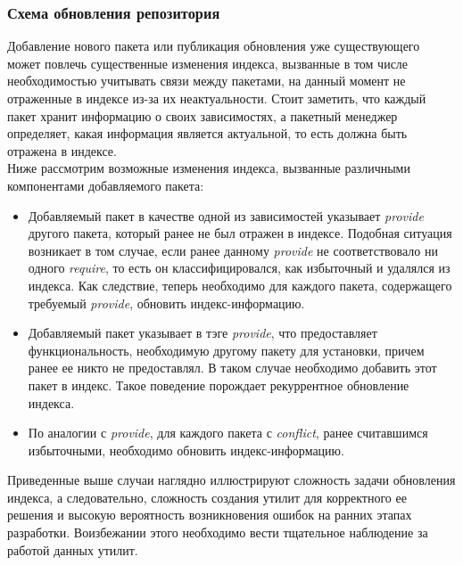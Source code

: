 \subsubsection{Схема обновления репозитория}
Добавление нового пакета или публикация обновления уже существующего
может повлечь существенные изменения индекса, вызванные в том числе
необходимостью учитывать связи между пакетами, на данный момент не
отраженные в индексе из-за их неактуальности. Стоит заметить, что 
каждый пакет хранит информацию о своих зависимостях, а пакетный
менеджер определяет, какая информация является актуальной, то есть
должна быть отражена в индексе.\\
Ниже рассмотрим возможные изменения индекса, вызванные различными
компонентами добавляемого пакета:
\begin{itemize}
\item
Добавляемый пакет в качестве одной из зависимостей указывает \textit{provide}
другого пакета, который ранее не был отражен в индексе. Подобная ситуация
возникает в том случае, если ранее данному \textit{provide} не соответствовало ни 
одного \textit{require}, то есть он классифицировался, как избыточный и удалялся
из индекса. Как следствие, теперь необходимо для каждого пакета, содержащего
требуемый \textit{provide}, обновить индекс-информацию.
\item
Добавляемый пакет указывает в тэге \textit{provide}, что предоставляет функциональность,
необходимую другому пакету для установки, причем ранее ее никто не предоставлял. В таком
случае необходимо добавить этот пакет в индекс. 
Такое поведение порождает рекуррентное обновление индекса.
\item
По аналогии с \textit{provide}, для каждого пакета с \textit{conflict}, ранее считавшимся
избыточными, необходимо обновить индекс-информацию.

\end{itemize}

Приведенные выше случаи наглядно иллюстрируют сложность задачи обновления индекса, а 
следовательно, сложность создания утилит для корректного ее решения и высокую вероятность
возникновения ошибок на ранних этапах разработки. Воизбежании этого необходимо вести
тщательное наблюдение за работой данных утилит.
